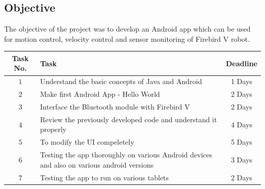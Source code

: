 \documentclass[a4paper,12pt,oneside]{book}
\begin{document}
\subsection*{Objective}
    The objective of the project was to develop an Android app which can be used for motion control, velocity control and sensor monitoring of Firebird V robot.
	\vspace{1cm}
		\begin{center}
	\begin{tabular}{|c|p{2.5in}|c|}
		\hline
		\textbf{Task No.} & \qquad \qquad \qquad \qquad \textbf{Task} & \textbf{Deadline}\\
		\hline
		$1$ & Understand the basic concepts of Java and Android & 1 Days\\
		\hline
		$2$ & Make first Android App - Hello World & 2 Days\\
		\hline
		$3$ & Interface the Bluetooth module with Firebird V & 2 Days\\
		\hline
		$4$ & Review the previously developed code and understand it properly & 4 Days\\
		\hline
		$5$ & To modify the UI compeletely & 5 Days\\
		\hline
		$6$ & Testing the app thoroughly on various Android devices and
		also on various android versions & 3 Days\\
		\hline
		$7$ & Testing the app to run on various tablets & 2 Days\\
		\hline
	\end{tabular}
	\end{center}
\newpage
\end{document}
